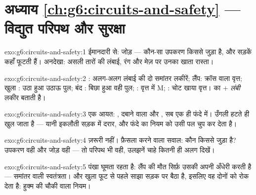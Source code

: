 \section*{अध्याय \ref{ch:g6:circuits-and-safety} --- विद्युत परिपथ और सुरक्षा}

\begin{solution}{exo:g6:circuits-and-safety:1}
ईमानदारी से: जोड़ --- कौन-सा उपकरण किससे जुड़ा है, और सड़कें कहाँ
फूटती हैं। अनदेखा: असली तारों की लंबाई, रंग और मेज़ पर उनका  खाता
रास्ता।
\end{solution}

\begin{solution}{exo:g6:circuits-and-safety:2}
: अलग-अलग लंबाई की दो समांतर लकीरें; लैंप: क्रॉस वाला वृत्त;
खुला : उठा हुआ उठाऊ पुल; बंद : बिछा हुआ वही पुल; :
वृत्त में M; : चोट खाया वृत्त।  का $+$ \emph{लंबी} लकीर बताती
है।
\end{solution}

\begin{solution}{exo:g6:circuits-and-safety:3}
एक आयत: , दबाने वाला  और , सब एक ही फंदे में। उँगली
हटते ही  खुल जाता है --- यानी इकलौती सड़क में दरार, और फंदे का
नियम  को उसी पल चुप कर देता है।
\end{solution}

\begin{solution}{exo:g6:circuits-and-safety:4}
ज़रूरी नहीं। फ़ैसला करने वाला सवाल: कौन किससे जुड़ा है? उपकरण वही और
जोड़ वही --- तो परिपथ भी वही, उलझनें चाहे कितनी ही अलग दिखें।
\end{solution}

\begin{solution}{exo:g6:circuits-and-safety:5}
पंखा घूमता रहता है: लैंप की मौत सिर्फ़ उसकी अपनी  अँधेरी करती है
--- समांतर वाली स्वतंत्रता। और खुला  फूट से पहले साझा सड़क पर
बैठा है, इसलिए वह दोनों को रोक देता है: हुक्म की चौकी वाला नियम।
\end{solution}

